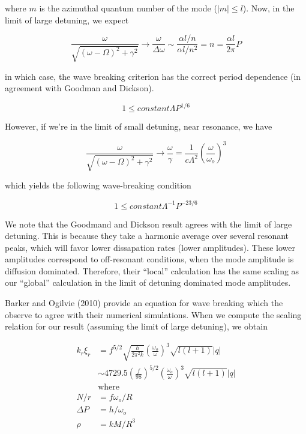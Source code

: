 where $m$ is the azimuthal quantum number of the mode ($|m| \leq l$). Now, in the limit of large detuning, we expect

\begin{equation}
\frac{\omega}{\sqrt{ (\omega-\Omega)^2 + \gamma^2}} \rightarrow \frac{\omega}{\Delta\omega} \sim \frac{\alpha l /n}{\alpha l /n^2} = n = \frac{\alpha l}{2\pi} P
\end{equation}

in which case, the wave breaking criterion has the correct period dependence (in agreement with Goodman and Dickson).

\begin{equation}
1 \leq constant \Lambda P^{1/6}
\end{equation}

However, if we're in the limit of small detuning, near resonance, we have

\begin{equation}
\frac{\omega}{\sqrt{ (\omega-\Omega)^2 + \gamma^2}} \rightarrow \frac{\omega}{\gamma} = \frac{1}{c\Lambda^2}\left(\frac{\omega}{\omega_o}\right)^3
\end{equation}

which yields the following wave-breaking condition

\begin{equation}
1 \leq constant \Lambda ^{-1} P^{-23/6}
\end{equation}

We note that the Goodmand and Dickson result agrees with the limit of large detuning. This is because they take a harmonic average over several resonant peaks, which will favor lower dissapation rates (lower amplitudes). These lower amplitudes correspond to off-resonant conditions, when the mode amplitude is diffusion dominated. Therefore, their ``local'' calculation has the same scaling as our ``global'' calculation in the limit of detuning dominated mode amplitudes.

Barker and Ogilvie (2010) provide an equation for wave breaking which the observe to agree with their numerical simulations. When we compute the scaling relation for our result (assuming the limit of large detuning), we obtain

\begin{subequations}
\begin{align}
k_r \xi_r & = f^{5/2} \sqrt{\frac{h}{2\pi^2 k}} \left(\frac{\omega_o}{\omega}\right)^3 \sqrt{l(l+1)} |q| \\
          & \sim 4729.5 \left(\frac{f}{98}\right)^{5/2} \left(\frac{\omega_o}{\omega}\right)^3 \sqrt{l(l+1)} |q| \\
& \text{where} \\
N/r & = f\omega_o/R \\
\Delta P & = h/\omega_o \\
\rho & = k M/R^3 \\
\end{align}
\end{subequations}

